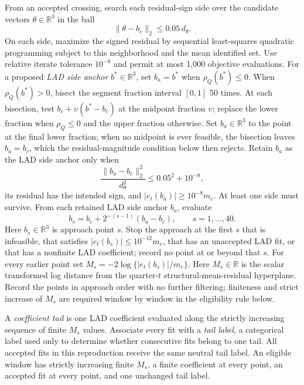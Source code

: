 \documentclass[11pt]{article}
\begin{document}
From an accepted crossing, search each residual-sign side over the candidate vectors
\(\theta\in\mathbb R^3\) in the ball
\begin{equation*}
 \|\theta-b_c\|_2\le0.05\,d_\theta.
\end{equation*}
On each side, maximize the signed residual by sequential least-squares quadratic programming subject
to this neighborhood and the mean identified set. Use relative iterate tolerance \(10^{-8}\) and
permit at most 1,000 objective evaluations. For a proposed \emph{LAD side anchor}
\(b^*\in\mathbb R^3\), set
\(b_a=b^*\) when \(\rho_Q(b^*)\le0\). When \(\rho_Q(b^*)>0\), bisect the segment fraction interval
\([0,1]\) 50 times. At each bisection, test \(b_c+\upsilon(b^*-b_c)\) at the midpoint fraction
\(\upsilon\); replace the lower fraction when \(\rho_Q\le0\) and the upper fraction otherwise. Set
\(b_a\in\mathbb R^3\) to the point at the final lower fraction; when no midpoint is ever feasible,
the bisection leaves \(b_a=b_c\), which the residual-magnitude condition below then rejects. Retain \(b_a\) as the LAD side anchor only when
\begin{equation*}
 \frac{\|b_a-b_c\|_2^2}{d_\theta^2}\le0.05^2+10^{-8},
\end{equation*}
its residual has the intended sign, and \(|e_t(b_a)|\ge10^{-8}m_e\). At least one side must
survive. From each retained LAD side anchor \(b_a\), evaluate
\begin{equation*}
 b_s=b_c+2^{-(s-1)}(b_a-b_c),\qquad s=1,\ldots,40.
\end{equation*}
Here \(b_s\in\mathbb R^3\) is approach point \(s\). Stop the approach at the first \(s\) that is
infeasible, that satisfies \(|e_t(b_s)|\le10^{-12}m_e\), that has an unaccepted LAD fit, or that has
a nonfinite LAD coefficient; record no point at or beyond that \(s\). For every earlier point set
\(M_s=-2\log\{|e_t(b_s)|/m_e\}\).
Here \(M_s\in\mathbb R\) is the scalar transformed log distance from the quarter-\(t\)
structural-mean-residual hyperplane. Record the points in approach order with no further filtering;
finiteness and strict increase of \(M_s\) are required window by window in the eligibility rule
below.

A \emph{coefficient tail} is one LAD coefficient evaluated along the strictly increasing sequence
of finite \(M_s\) values. Associate every fit with a \emph{tail label}, a categorical label used only
to determine whether consecutive fits belong to one tail. All accepted fits in this reproduction
receive the same neutral tail label. An eligible window has strictly increasing finite \(M_s\), a
finite coefficient at every point, an accepted fit at every point, and one unchanged tail label.
\end{document}
